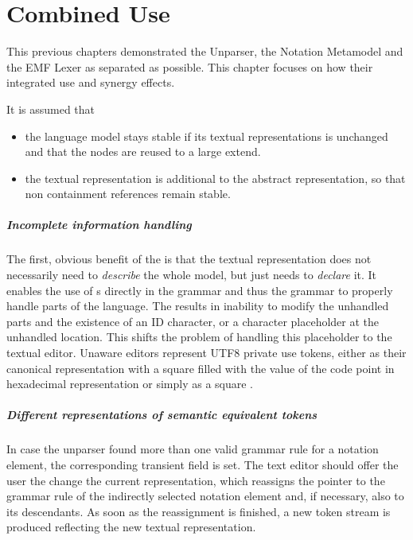 \chapter{Combined Use}
This previous chapters  demonstrated the Unparser, the Notation Metamodel and the EMF Lexer as separated as possible. This chapter focuses on how their integrated use and synergy effects. 

It is assumed that 
\begin{itemize}
	\item the language model stays stable if its textual representations is unchanged and that the nodes are reused to a large extend.
	\item the textual representation is additional to the abstract representation, so that non containment references remain stable.
\end{itemize}

\paragraph{Incomplete information handling}
The first, obvious benefit of the  is that the textual representation does not necessarily need to \emph{describe} the whole model, but just needs to \emph{declare} it. It enables the use of s directly in the grammar and thus the grammar to properly handle parts of the language. The results in inability to modify the unhandled parts and the existence of an ID character, or a character placeholder at the unhandled location. This shifts the problem of handling this placeholder to the textual editor. Unaware editors represent UTF8 private use tokens, either as their canonical representation with a square filled with the value of the code point in hexadecimal representation or simply as a square \code{$\square$}.

\paragraph{Different representations of semantic equivalent tokens}
In case the unparser found more than one valid grammar rule for a notation element, the corresponding transient field is set. The text editor should offer the user the change the current representation, which reassigns the pointer to the grammar rule of the indirectly selected notation element and, if necessary, also to its descendants. As soon as the reassignment is finished, a new token stream is produced reflecting the new textual representation.


